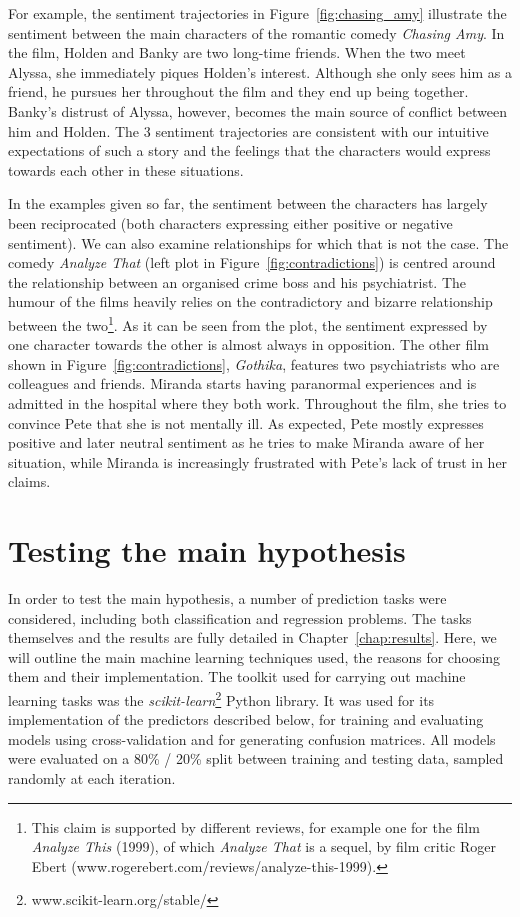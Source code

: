 \documentclass[bsc,frontabs,deptreport,singlespacing,parskip, twoside]{infthesis}
\begin{document}
For example, the sentiment trajectories in Figure~\ref{fig:chasing_amy} illustrate the sentiment between the main characters of the romantic comedy \textit{Chasing Amy}. In the film, Holden and Banky are two long-time friends. When the two meet Alyssa, she immediately piques Holden's interest. Although she only sees him as a friend, he pursues her throughout the film and they end up being together. Banky's distrust of Alyssa, however, becomes the main source of conflict between him and Holden. The 3 sentiment trajectories are consistent with our intuitive expectations of such a story and the feelings that the characters would express towards each other in these situations.

In the examples given so far, the sentiment between the characters has largely been reciprocated (both characters expressing either positive or negative sentiment). We can also examine relationships for which that is not the case. The comedy \textit{Analyze That} (left plot in Figure~\ref{fig:contradictions}) is centred around the relationship between an organised crime boss and his psychiatrist. The humour of the films heavily relies on the contradictory and bizarre relationship between the two\footnote{This claim is supported by different reviews, for example one for the film \textit{Analyze This} (1999), of which \textit{Analyze That} is a sequel, by film critic Roger Ebert (www.rogerebert.com/reviews/analyze-this-1999).}. As it can be seen from the plot, the sentiment expressed by one character towards the other is almost always in opposition. The other film shown in Figure~\ref{fig:contradictions}, \textit{Gothika}, features two psychiatrists who are colleagues and friends. Miranda starts having paranormal experiences and is admitted in the hospital where they both work. Throughout the film, she tries to convince Pete that she is not mentally ill. As expected, Pete mostly expresses positive and later neutral sentiment as he tries to make Miranda aware of her situation, while Miranda is increasingly frustrated with Pete's lack of trust in her claims.


\section{Testing the main hypothesis}
\label{sec:predictors}
In order to test the main hypothesis, a number of prediction tasks were considered, including both classification and regression problems. The tasks themselves and the results are fully detailed in Chapter~\ref{chap:results}. Here, we will outline the main machine learning techniques used, the reasons for choosing them and their implementation. The toolkit used for carrying out machine learning tasks was the \textit{scikit-learn}\footnote{www.scikit-learn.org/stable/} Python library. It was used for its implementation of the predictors described below, for training and evaluating models using cross-validation and for generating confusion matrices. All models were evaluated on a 80\% / 20\% split between training and testing data, sampled randomly at each iteration.
\end{document}
